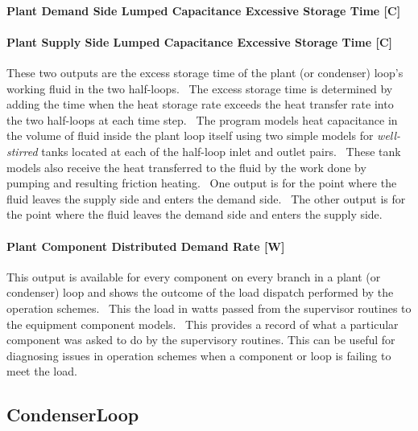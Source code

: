 \paragraph{Plant Demand Side Lumped Capacitance Excessive Storage Time {[}C{]}}\label{plant-demand-side-lumped-capacitance-excess-storage-time-hr}

\paragraph{Plant Supply Side Lumped Capacitance Excessive Storage Time {[}C{]}}\label{plant-supply-side-lumped-capacitance-excess-storage-time-hr}

These two outputs are the excess storage time of the plant (or condenser) loop's working fluid in the two half-loops.~ The excess storage time is determined by adding the time when the heat storage rate exceeds the heat transfer rate into the two half-loops at each time step.~ The program models heat capacitance in the volume of fluid inside the plant loop itself using two simple models for \textit{well-stirred} tanks located at each of the half-loop inlet and outlet pairs.~ These tank models also receive the heat transferred to the fluid by the work done by pumping and resulting friction heating.~ One output is for the point where the fluid leaves the supply side and enters the demand side.~ The other output is for the point where the fluid leaves the demand side and enters the supply side.

\paragraph{Plant Component Distributed Demand Rate {[}W{]}}\label{plant-component-distributed-demand-rate-w}

This output is available for every component on every branch in a plant (or condenser) loop and shows the outcome of the load dispatch performed by the operation schemes.~ This the load in watts passed from the supervisor routines to the equipment component models.~ This provides a record of what a particular component was asked to do by the supervisory routines. This can be useful for diagnosing issues in operation schemes when a component or loop is failing to meet the load.

\subsection{CondenserLoop}\label{condenserloop}

